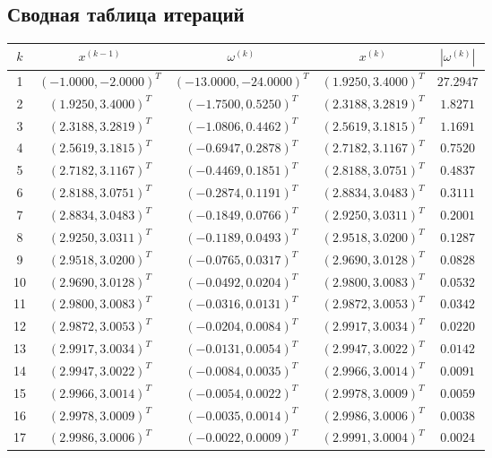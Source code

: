 \documentclass[12pt]{article}
\begin{document}
\subsection{Сводная таблица итераций}
\begin{table}[H]
\centering
\begin{tabular}{|c|c|c|c|c|}
\hline
$k$ & $x^{(k-1)}$ & $\omega^{(k)}$ & $x^{(k)}$ & $|\omega^{(k)}|$ \\
\hline
1 & $(-1.0000, -2.0000)^T$ & $(-13.0000, -24.0000)^T$ & $(1.9250, 3.4000)^T$ & $27.2947$ \\
\hline
2 & $(1.9250, 3.4000)^T$ & $(-1.7500, 0.5250)^T$ & $(2.3188, 3.2819)^T$ & $1.8271$ \\
\hline
3 & $(2.3188, 3.2819)^T$ & $(-1.0806, 0.4462)^T$ & $(2.5619, 3.1815)^T$ & $1.1691$ \\
\hline
4 & $(2.5619, 3.1815)^T$ & $(-0.6947, 0.2878)^T$ & $(2.7182, 3.1167)^T$ & $0.7520$ \\
\hline
5 & $(2.7182, 3.1167)^T$ & $(-0.4469, 0.1851)^T$ & $(2.8188, 3.0751)^T$ & $0.4837$ \\
\hline
6 & $(2.8188, 3.0751)^T$ & $(-0.2874, 0.1191)^T$ & $(2.8834, 3.0483)^T$ & $0.3111$ \\
\hline
7 & $(2.8834, 3.0483)^T$ & $(-0.1849, 0.0766)^T$ & $(2.9250, 3.0311)^T$ & $0.2001$ \\
\hline
8 & $(2.9250, 3.0311)^T$ & $(-0.1189, 0.0493)^T$ & $(2.9518, 3.0200)^T$ & $0.1287$ \\
\hline
9 & $(2.9518, 3.0200)^T$ & $(-0.0765, 0.0317)^T$ & $(2.9690, 3.0128)^T$ & $0.0828$ \\
\hline
10 & $(2.9690, 3.0128)^T$ & $(-0.0492, 0.0204)^T$ & $(2.9800, 3.0083)^T$ & $0.0532$ \\
\hline
11 & $(2.9800, 3.0083)^T$ & $(-0.0316, 0.0131)^T$ & $(2.9872, 3.0053)^T$ & $0.0342$ \\
\hline
12 & $(2.9872, 3.0053)^T$ & $(-0.0204, 0.0084)^T$ & $(2.9917, 3.0034)^T$ & $0.0220$ \\
\hline
13 & $(2.9917, 3.0034)^T$ & $(-0.0131, 0.0054)^T$ & $(2.9947, 3.0022)^T$ & $0.0142$ \\
\hline
14 & $(2.9947, 3.0022)^T$ & $(-0.0084, 0.0035)^T$ & $(2.9966, 3.0014)^T$ & $0.0091$ \\
\hline
15 & $(2.9966, 3.0014)^T$ & $(-0.0054, 0.0022)^T$ & $(2.9978, 3.0009)^T$ & $0.0059$ \\
\hline
16 & $(2.9978, 3.0009)^T$ & $(-0.0035, 0.0014)^T$ & $(2.9986, 3.0006)^T$ & $0.0038$ \\
\hline
17 & $(2.9986, 3.0006)^T$ & $(-0.0022, 0.0009)^T$ & $(2.9991, 3.0004)^T$ & $0.0024$ \\

\end{tabular}
\end{table}
\end{document}
